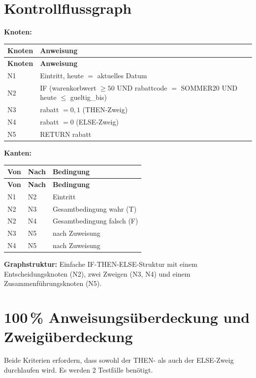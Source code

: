\documentclass[
	fontsize=12pt,          %
	paper=a4,               %
	numbers=noenddot,       %
	listof=totoc,           %
	listof=entryprefix,     %
	listof=nochaptergap,    %
	bibliography=totoc,     %
	parskip=half,           %
	openany                 %
]{scrbook}
\begin{document}
\section*{Kontrollflussgraph}

\textbf{Knoten:}

\begin{longtable}{| p{1.2cm} | p{10.5cm} |}
	\hline
	\textbf{Knoten} & \textbf{Anweisung} \\ \hline
	\endfirsthead
	\hline
	\textbf{Knoten} & \textbf{Anweisung} \\ \hline
	\endhead
	\hline
	\endfoot
	N1 & Eintritt, heute $=$ aktuelles Datum \\ \hline
	N2 & IF (warenkorbwert $\geq 50$ UND rabattcode $=$ \glqq SOMMER20\grqq{} UND heute $\leq$ gueltig\_bis) \\ \hline
	N3 & rabatt $= 0{,}1$ (THEN-Zweig) \\ \hline
	N4 & rabatt $= 0$ (ELSE-Zweig) \\ \hline
	N5 & RETURN rabatt \\ \hline
\end{longtable}

\textbf{Kanten:}

\begin{longtable}{| p{1.5cm} | p{1.5cm} | p{8.5cm} |}
	\hline
	\textbf{Von} & \textbf{Nach} & \textbf{Bedingung} \\ \hline
	\endfirsthead
	\hline
	\textbf{Von} & \textbf{Nach} & \textbf{Bedingung} \\ \hline
	\endhead
	\hline
	\endfoot
	N1 & N2 & Eintritt \\ \hline
	N2 & N3 & Gesamtbedingung wahr (T) \\ \hline
	N2 & N4 & Gesamtbedingung falsch (F) \\ \hline
	N3 & N5 & nach Zuweisung \\ \hline
	N4 & N5 & nach Zuweisung \\ \hline
\end{longtable}

\textbf{Graphstruktur:}
Einfache IF-THEN-ELSE-Struktur mit einem Entscheidungsknoten (N2), zwei Zweigen (N3, N4) und einem Zusammenführungsknoten (N5).

\section*{100\,\% Anweisungsüberdeckung und Zweigüberdeckung}

Beide Kriterien erfordern, dass sowohl der THEN- als auch der ELSE-Zweig durchlaufen wird.
Es werden 2 Testfälle benötigt.
\end{document}
